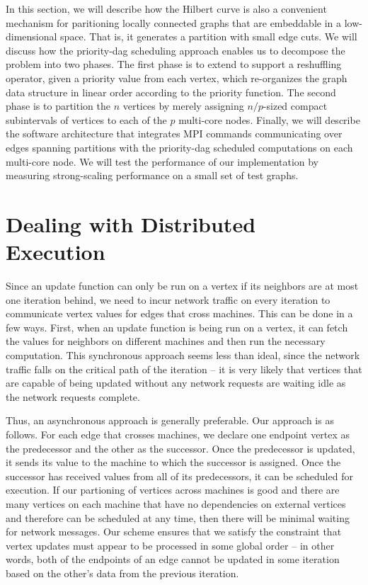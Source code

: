 In this section, we will describe how the Hilbert curve is also
a convenient mechanism for paritioning locally connected graphs
that are embeddable in a low-dimensional space.  That is, it 
generates a partition with small edge cuts.  We will discuss how
the priority-dag scheduling approach enables us to decompose the 
problem into two phases.  The first phase is to extend 
to support a reshuffling operator, given a priority value from each
vertex, which re-organizes the graph data structure in linear order 
according to the priority function.  The second phase is to partition
the $n$ vertices by merely assigning $n/p$-sized compact subintervals
of vertices to each of the $p$ multi-core nodes.  Finally, we 
will describe the software architecture that integrates MPI commands
communicating over edges spanning partitions with the priority-dag 
scheduled computations on each multi-core node.  We will test the
performance of our implementation by measuring strong-scaling
performance on a small set of test graphs.


\section{Dealing with Distributed Execution}
Since an update function can only be run on a vertex if its 
neighbors are at most one iteration behind, we need to incur 
network traffic on every iteration to communicate vertex values 
for edges that cross machines. This can be done in a few ways. 
First, when an update function is being run on a vertex, it can 
fetch the values for neighbors on different machines and then 
run the necessary computation. This synchronous approach seems 
less than ideal, since the network traffic falls on the critical 
path of the iteration -- it is very likely that vertices that 
are capable of being updated without any network requests are 
waiting idle as the network requests complete.

Thus, an asynchronous approach is generally preferable. Our 
approach is as follows. For each edge that crosses machines, 
we declare one endpoint vertex as the predecessor and the other 
as the successor. Once the predecessor is updated, it sends 
its value to the machine to which the successor is assigned. 
Once the successor has received values from all of its 
predecessors, it can be scheduled for execution. If our 
partioning of vertices across machines is good and there are 
many vertices on each machine that have no dependencies on 
external vertices and therefore can be scheduled at any time, 
then there will be minimal waiting for network messages. Our 
scheme ensures that we satisfy the constraint that vertex 
updates must appear to be processed in some global order -- 
in other words, both of the endpoints of an edge cannot be 
updated in some iteration based on the other's data from 
the previous iteration.

